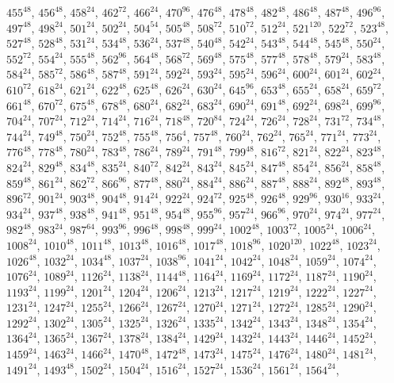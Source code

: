 \begin{itemize}
$455^{48}$, $456^{48}$, $458^{24}$, $462^{72}$, $466^{24}$, $470^{96}$, $476^{48}$, $478^{48}$, $482^{48}$, $486^{48}$, $487^{48}$, $496^{96}$, $497^{48}$, $498^{24}$, $501^{24}$, $502^{24}$, $504^{54}$, $505^{48}$, $508^{72}$, $510^{72}$, $512^{24}$, $521^{120}$, $522^{72}$, $523^{48}$, $527^{48}$, $528^{48}$, $531^{24}$, $534^{48}$, $536^{24}$, $537^{48}$, $540^{48}$, $542^{24}$, $543^{48}$, $544^{48}$, $545^{48}$, $550^{24}$, $552^{72}$, $554^{24}$, $555^{48}$, $562^{96}$, $564^{48}$, $568^{72}$, $569^{48}$, $575^{48}$, $577^{48}$, $578^{48}$, $579^{24}$, $583^{48}$, $584^{24}$, $585^{72}$, $586^{48}$, $587^{48}$, $591^{24}$, $592^{24}$, $593^{24}$, $595^{24}$, $596^{24}$, $600^{24}$, $601^{24}$, $602^{24}$, $610^{72}$, $618^{24}$, $621^{24}$, $622^{48}$, $625^{48}$, $626^{24}$, $630^{24}$, $645^{96}$, $653^{48}$, $655^{24}$, $658^{24}$, $659^{72}$, $661^{48}$, $670^{72}$, $675^{48}$, $678^{48}$, $680^{24}$, $682^{24}$, $683^{24}$, $690^{24}$, $691^{48}$, $692^{24}$, $698^{24}$, $699^{96}$, $704^{24}$, $707^{24}$, $712^{24}$, $714^{24}$, $716^{24}$, $718^{48}$, $720^{84}$, $724^{24}$, $726^{24}$, $728^{24}$, $731^{72}$, $734^{48}$, $744^{24}$, $749^{48}$, $750^{24}$, $752^{48}$, $755^{48}$, $756^{4}$, $757^{48}$, $760^{24}$, $762^{24}$, $765^{24}$, $771^{24}$, $773^{24}$, $776^{48}$, $778^{48}$, $780^{24}$, $783^{48}$, $786^{24}$, $789^{24}$, $791^{48}$, $799^{48}$, $816^{72}$, $821^{24}$, $822^{24}$, $823^{48}$, $824^{24}$, $829^{48}$, $834^{48}$, $835^{24}$, $840^{72}$, $842^{24}$, $843^{24}$, $845^{24}$, $847^{48}$, $854^{24}$, $856^{24}$, $858^{48}$, $859^{48}$, $861^{24}$, $862^{72}$, $866^{96}$, $877^{48}$, $880^{24}$, $884^{24}$, $886^{24}$, $887^{48}$, $888^{24}$, $892^{48}$, $893^{48}$, $896^{72}$, $901^{24}$, $903^{48}$, $904^{48}$, $914^{24}$, $922^{24}$, $924^{72}$, $925^{48}$, $926^{48}$, $929^{96}$, $930^{16}$, $933^{24}$, $934^{24}$, $937^{48}$, $938^{48}$, $941^{48}$, $951^{48}$, $954^{48}$, $955^{96}$, $957^{24}$, $966^{96}$, $970^{24}$, $974^{24}$, $977^{24}$, $982^{48}$, $983^{24}$, $987^{64}$, $993^{96}$, $996^{48}$, $998^{48}$, $999^{24}$, $1002^{48}$, $1003^{72}$, $1005^{24}$, $1006^{24}$, $1008^{24}$, $1010^{48}$, $1011^{48}$, $1013^{48}$, $1016^{48}$, $1017^{48}$, $1018^{96}$, $1020^{120}$, $1022^{48}$, $1023^{24}$, $1026^{48}$, $1032^{24}$, $1034^{48}$, $1037^{24}$, $1038^{96}$, $1041^{24}$, $1042^{24}$, $1048^{24}$, $1059^{24}$, $1074^{24}$, $1076^{24}$, $1089^{24}$, $1126^{24}$, $1138^{24}$, $1144^{48}$, $1164^{24}$, $1169^{24}$, $1172^{24}$, $1187^{24}$, $1190^{24}$, $1193^{24}$, $1199^{24}$, $1201^{24}$, $1204^{24}$, $1206^{24}$, $1213^{24}$, $1217^{24}$, $1219^{24}$, $1222^{24}$, $1227^{24}$, $1231^{24}$, $1247^{24}$, $1255^{24}$, $1266^{24}$, $1267^{24}$, $1270^{24}$, $1271^{24}$, $1272^{24}$, $1285^{24}$, $1290^{24}$, $1292^{24}$, $1302^{24}$, $1305^{24}$, $1325^{24}$, $1326^{24}$, $1335^{24}$, $1342^{24}$, $1343^{24}$, $1348^{24}$, $1354^{24}$, $1364^{24}$, $1365^{24}$, $1367^{24}$, $1378^{24}$, $1384^{24}$, $1429^{24}$, $1432^{24}$, $1443^{24}$, $1446^{24}$, $1452^{24}$, $1459^{24}$, $1463^{24}$, $1466^{24}$, $1470^{48}$, $1472^{48}$, $1473^{24}$, $1475^{24}$, $1476^{24}$, $1480^{24}$, $1481^{24}$, $1491^{24}$, $1493^{48}$, $1502^{24}$, $1504^{24}$, $1516^{24}$, $1527^{24}$, $1536^{24}$, $1561^{24}$, $1564^{24}$, 
\end{itemize}
